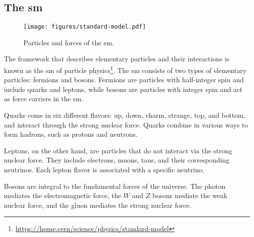 \subsection[The Standard Model]{The \acrlong{sm}}

\begin{figure}[htb]
    \centering
    \texttt{[image: figures/standard-model.pdf]}
    \caption{Particles and forces of the \gls{sm}.}
    \label{fig:standard-model}
\end{figure}

The framework that describes elementary particles and their interactions is known as the \gls{sm} of particle
physics\footnote{\url{https://home.cern/science/physics/standard-model}}. The \gls{sm} consists of two types of
elementary particles: fermions and bosons. Fermions are particles with half-integer spin and include quarks and leptons,
while bosons are particles with integer spin and act as force carriers
in the \gls{sm}.

Quarks come in six different flavors: up, down, charm, strange, top, and bottom, and interact
through the strong nuclear force. Quarks combine in various ways to form hadrons, such as protons and neutrons.

Leptons, on the other hand, are particles that do not interact via the strong nuclear force. They include electrons,
muons, taus, and their corresponding neutrinos. Each lepton flavor is associated with a specific neutrino.

Bosons are integral to the fundamental forces of the universe. The photon mediates the electromagnetic force, the $W$
and $Z$ bosons mediate the weak nuclear force, and the gluon mediates the strong nuclear force.
